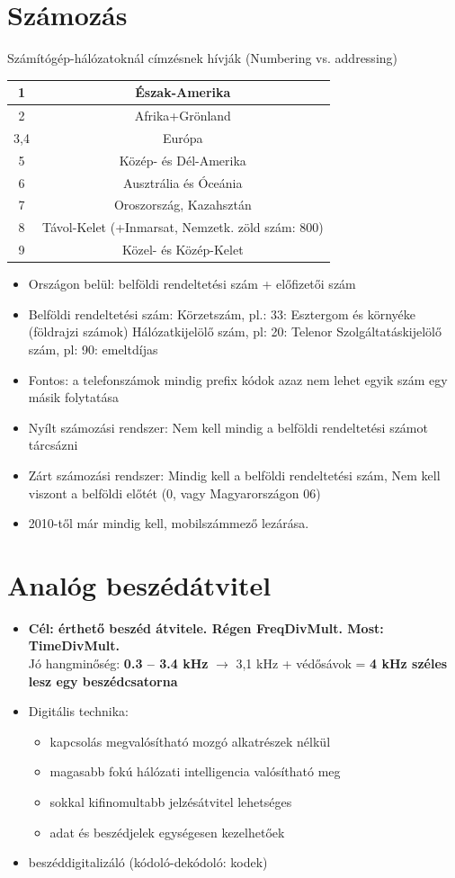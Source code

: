 \documentclass[10pt,a4paper]{article}
\begin{document}
\section{Számozás}
Számítógép-hálózatoknál címzésnek hívják (Numbering vs.
addressing)\\
\begin{tabular}{|c|c|}
	\hline 
	 1  &Észak-Amerika\\ 
	\hline 
	2 &Afrika+Grönland  \\ 
	\hline 
	3,4&Európa  \\ 
	\hline 
	5&Közép- és Dél-Amerika  \\ 
	\hline 
	6& Ausztrália és Óceánia \\ 
	\hline 
	7&Oroszország, Kazahsztán \\ 
	\hline 
	8&  Távol-Kelet (+Inmarsat,
	Nemzetk. zöld szám: 800)\\ 
	\hline 
	9& Közel- és Közép-Kelet\\ 
	\hline 
\end{tabular} 
\begin{itemize}
	\item Országon belül: belföldi rendeltetési szám + előfizetői
	szám
	\item Belföldi rendeltetési szám:
	Körzetszám, pl.: 33: Esztergom és környéke (földrajzi számok)
	Hálózatkijelölő szám, pl: 20: Telenor
	Szolgáltatáskijelölő szám, pl: 90: emeltdíjas
	\item Fontos: a telefonszámok mindig prefix kódok
	azaz nem lehet egyik szám egy másik folytatása
	\item Nyílt számozási rendszer: Nem kell mindig a belföldi rendeltetési számot tárcsázni
	\item Zárt számozási rendszer: Mindig kell a belföldi rendeltetési szám, Nem kell viszont a belföldi előtét (0, vagy Magyarországon 06)
	\item 2010-től már mindig kell, mobilszámmező lezárása.
\end{itemize}
\section{Analóg beszédátvitel}
\begin{itemize}
	\item\textbf{ Cél: érthető beszéd átvitele. Régen FreqDivMult. Most: TimeDivMult.}\\
Jó hangminőség: \textbf{0.3 -- 3.4 kHz} $\rightarrow$ 3,1 kHz + védősávok = \textbf{4 kHz széles lesz egy beszédcsatorna}
\item Digitális technika:\begin{itemize}
	\item kapcsolás megvalósítható mozgó alkatrészek nélkül
\item magasabb fokú hálózati intelligencia valósítható meg
\item sokkal kifinomultabb jelzésátvitel lehetséges
\item adat és beszédjelek egységesen kezelhetőek
\end{itemize}
\item beszéddigitalizáló (kódoló-dekódoló: kodek)
\end{itemize}
\end{document}
